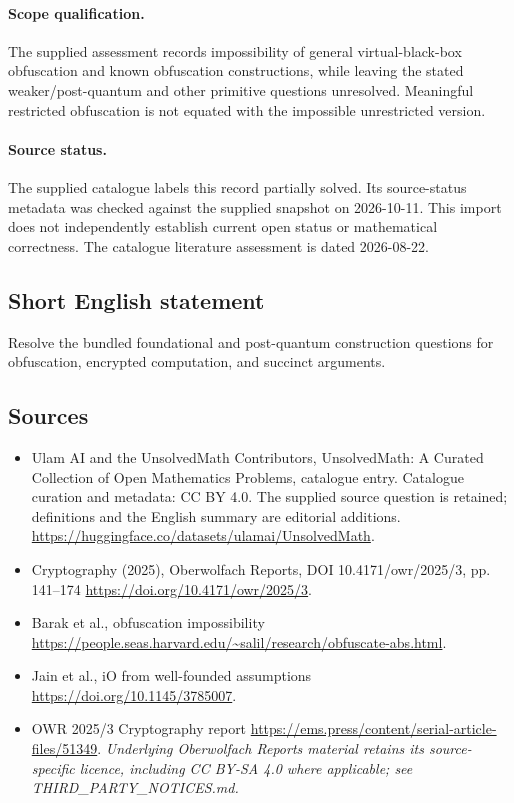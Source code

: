 \documentclass[11pt]{article}
\begin{document}
\paragraph{Scope qualification.}
The supplied assessment records impossibility of general virtual-black-box obfuscation and known obfuscation constructions, while leaving the stated weaker/post-quantum and other primitive questions unresolved. Meaningful restricted obfuscation is not equated with the impossible unrestricted version.
\paragraph{Source status.}
The supplied catalogue labels this record partially solved. Its source-status metadata was checked against the supplied snapshot on 2026-10-11. This import does not independently establish current open status or mathematical correctness. The catalogue literature assessment is dated 2026-08-22.
\subsection{Short English statement}
Resolve the bundled foundational and post-quantum construction questions for obfuscation, encrypted computation, and succinct arguments.
\subsection{Sources}
\begin{itemize}
\item[\hypertarget{source:statement:1}{S1}] Ulam AI and the UnsolvedMath Contributors, UnsolvedMath: A Curated Collection of Open Mathematics Problems, catalogue entry. Catalogue curation and metadata: CC BY 4.0. The supplied source question is retained; definitions and the English summary are editorial additions.
\url{https://huggingface.co/datasets/ulamai/UnsolvedMath}.
\item[\hypertarget{source:statement:2}{S2}] Cryptography (2025), Oberwolfach Reports, DOI 10.4171/owr/2025/3, pp. 141--174
\url{https://doi.org/10.4171/owr/2025/3}.
\item[\hypertarget{source:statement:3}{S3}] Barak et al., obfuscation impossibility
\url{https://people.seas.harvard.edu/~salil/research/obfuscate-abs.html}.
\item[\hypertarget{source:statement:4}{S4}] Jain et al., iO from well-founded assumptions
\url{https://doi.org/10.1145/3785007}.
\item[\hypertarget{source:statement:5}{S5}] OWR 2025/3 Cryptography report
\url{https://ems.press/content/serial-article-files/51349}.
\textit{Underlying Oberwolfach Reports material retains its source-specific licence, including CC BY-SA 4.0 where applicable; see THIRD\_PARTY\_NOTICES.md.}
\end{itemize}
\end{document}
